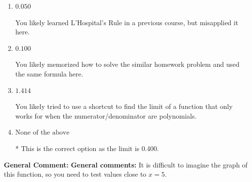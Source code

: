 \documentclass{extbook}[14pt]
\begin{document}
\begin{enumerate}
{\begin{enumerate}[label=\Alph*.]
You likely believed that since the denominator is equal to 0, the limit is infinity.
\item \( 0.050 \)

You likely learned L'Hospital's Rule in a previous course, but misapplied it here.
\item \( 0.100 \)

You likely memorized how to solve the similar homework problem and used the same formula here.
\item \( 1.414 \)

You likely tried to use a shortcut to find the limit of a function that only works for when the numerator/denominator are polynomials.
\item \( \text{None of the above} \)

* This is the correct option as the limit is 0.400.
\end{enumerate}

\textbf{General Comment:} \textbf{General comments:} It is difficult to imagine the graph of this function, so you need to test values close to $x = 5$.
}
\end{enumerate}
\end{document}
